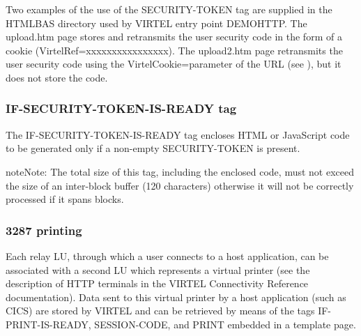 \documentclass[letterpaper,10pt,english]{sphinxmanual}
\begin{document}
Two examples of the use of the SECURITY-TOKEN tag are supplied in the HTMLBAS directory used by VIRTEL entry point DEMOHTTP. The upload.htm page stores and retransmits the user security code in the form of a cookie (VirtelRef=xxxxxxxxxxxxxxxx). The upload2.htm page retransmits the user security code using the VirtelCookie=parameter of the URL (see {\hyperref[\detokenize{User_Guide:v457ug-cookie-upload}]{}}), but it does not store the code.


\subsubsection{IF-SECURITY-TOKEN-IS-READY tag}
\label{\detokenize{User_Guide:index-5}}\label{\detokenize{User_Guide:if-security-token-is-ready-tag}}
\begin{sphinxVerbatim}[commandchars=\\\{\}]
\end{sphinxVerbatim}

The IF-SECURITY-TOKEN-IS-READY tag encloses HTML or JavaScript code to be generated only if a non-empty SECURITY-TOKEN is present.

\begin{sphinxadmonition}{note}{Note:}
The total size of this tag, including the enclosed code, must not exceed the size of an inter-block buffer (120 characters) otherwise it will not be correctly processed if it spans blocks.
\end{sphinxadmonition}


\subsubsection{3287 printing}
\label{\detokenize{User_Guide:printing}}\label{\detokenize{User_Guide:v457ug-printing}}
Each relay LU, through which a user connects to a host application, can be associated with a second LU which represents a virtual printer (see the description of HTTP terminals in the VIRTEL Connectivity Reference documentation). Data sent to this virtual printer by a host application (such as CICS) are stored by VIRTEL and can be retrieved by means of the tags IF-PRINT-IS-READY, SESSION-CODE, and PRINT embedded in a template page.
\end{document}
